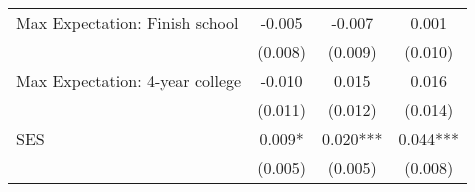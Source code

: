 {\begin{tabular}{lccc}
\hspace{3mm}Max Expectation: Finish school&      -0.005   &      -0.007   &       0.001   \\
                    &     (0.008)   &     (0.009)   &     (0.010)   \\
 
\hspace{3mm}Max Expectation: 4-year college&      -0.010   &       0.015   &       0.016   \\
                    &     (0.011)   &     (0.012)   &     (0.014)   \\
 
\hspace{3mm}SES     &       0.009*  &       0.020***&       0.044***\\
                    &     (0.005)   &     (0.005)   &     (0.008)   \\
 

\bottomrule
\end{tabular}
}
